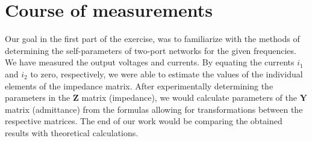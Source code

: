 \documentclass[notitlepage, a4paper, 11pt]{article}
\begin{document}
	\section{Course of measurements}  
	Our goal in the first part of the exercise, was to familiarize with the methods of determining the self-parameters of two-port networks for the given frequencies. We have measured the output voltages and currents. By equating the currents $i_1$ and $i_2$ to zero, respectively, we were able to estimate the values of the individual elements of the impedance matrix. After experimentally determining the parameters in the $\mathbf{Z}$ matrix (impedance), we would calculate parameters of the $\mathbf{Y}$ matrix (admittance) from the formulas allowing for transformations between the respective matrices. The end of our work would be comparing the obtained results with theoretical calculations.
\end{document}

